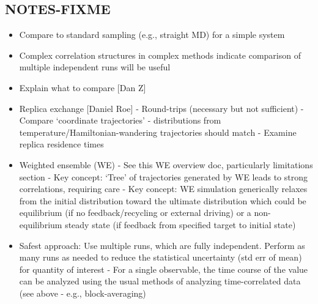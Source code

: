 \subsection{NOTES-FIXME}
\begin{itemize}
  \item Compare to standard sampling (e.g., straight MD) for a simple system
  \item Complex correlation structures in complex methods indicate comparison of multiple independent runs will be useful
  \item Explain what to compare [Dan Z]
  \item Replica exchange [Daniel Roe]
    - Round-trips (necessary but not sufficient)
    - Compare ‘coordinate trajectories’ - distributions from temperature/Hamiltonian-wandering trajectories should match
    - Examine replica residence times
  \item Weighted ensemble (WE)
    - See this WE overview doc, particularly limitations section
    - Key concept: ‘Tree’ of trajectories generated by WE leads to strong correlations, requiring care
    - Key concept: WE simulation generically relaxes from the initial distribution toward the ultimate distribution which could be equilibrium (if no feedback/recycling or external driving) or a non-equilibrium steady state (if feedback from specified target to initial state)
  \item Safest approach: Use multiple runs, which are fully independent.  Perform as many runs as needed to reduce the statistical uncertainty (std err of mean) for quantity of interest
    - For a single observable, the time course of the value can be analyzed using the usual methods of analyzing time-correlated data (see above - e.g., block-averaging)
\end{itemize}
